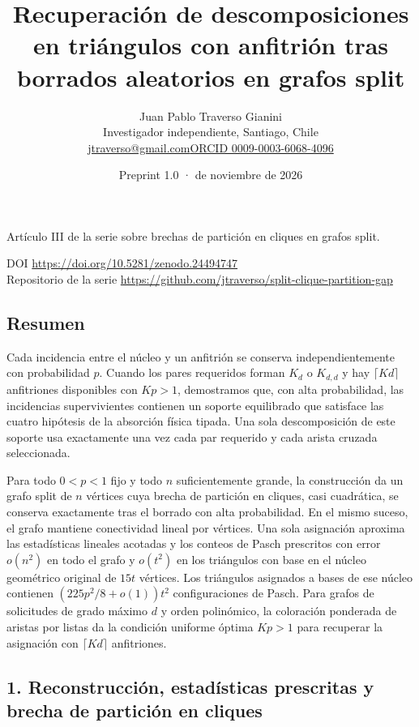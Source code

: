 \documentclass[spanish,11pt,a4paper]{article}
\title{Recuperación de descomposiciones en triángulos con anfitrión tras borrados aleatorios en grafos split}
\author{Juan Pablo Traverso Gianini\\\small Investigador independiente, Santiago, Chile\\\small\href{mailto:jtraverso@gmail.com}{jtraverso@gmail.com}\quad\href{https://orcid.org/0009-0003-6068-4096}{ORCID 0009-0003-6068-4096}}
\date{Preprint 1.0 \enspace·\enspace 24 de noviembre de 2026}
\begin{document}
\raggedbottom\maketitle
\begin{center}Artículo III de la serie sobre brechas de partición en cliques en grafos split.\end{center}
\noindent DOI \url{https://doi.org/10.5281/zenodo.24494747}\\
Repositorio de la serie \url{https://github.com/jtraverso/split-clique-partition-gap}
\subsection{Resumen}\label{resumen}

Cada incidencia entre el núcleo y un anfitrión se conserva independientemente con probabilidad \(p\). Cuando los pares requeridos forman \(K_d\) o \(K_{d,d}\) y hay \(\lceil Kd\rceil\) anfitriones disponibles con \(Kp>1\), demostramos que, con alta probabilidad, las incidencias supervivientes contienen un soporte equilibrado que satisface las cuatro hipótesis de la absorción física tipada. Una sola descomposición de este soporte usa exactamente una vez cada par requerido y cada arista cruzada seleccionada.

Para todo \(0<p<1\) fijo y todo \(n\) suficientemente grande, la construcción da un grafo split de \(n\) vértices cuya brecha de partición en cliques, casi cuadrática, se conserva exactamente tras el borrado con alta probabilidad. En el mismo suceso, el grafo mantiene conectividad lineal por vértices. Una sola asignación aproxima las estadísticas lineales acotadas y los conteos de Pasch prescritos con error \(o(n^2)\) en todo el grafo y \(o(t^2)\) en los triángulos con base en el núcleo geométrico original de \(15t\) vértices. Los triángulos asignados a bases de ese núcleo contienen \((225p^2/8+o(1))t^2\) configuraciones de Pasch. Para grafos de solicitudes de grado máximo \(d\) y orden polinómico, la coloración ponderada de aristas por listas da la condición uniforme óptima \(Kp>1\) para recuperar la asignación con \(\lceil Kd\rceil\) anfitriones.

\subsection{1. Reconstrucción, estadísticas prescritas y brecha de partición en cliques}\label{reconstrucciuxf3n-estaduxedsticas-prescritas-y-brecha-de-particiuxf3n-en-cliques}
\end{document}
